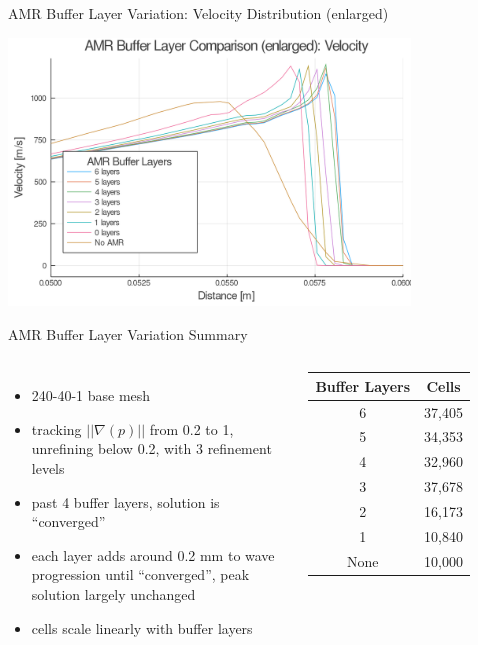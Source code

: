 \begin{frame}{AMR Buffer Layer Variation: Velocity Distribution (enlarged)}
\begin{center}
\includegraphics[width=0.8\textwidth]{../figs/amrfigs/amr_bufflayers/ue.png}
\end{center}
\end{frame}

\begin{frame}{AMR Buffer Layer Variation Summary}
\begin{columns}
\begin{itemize}
\item 240-40-1 base mesh
\item tracking $||\nabla (p)||$ from 0.2 to 1, unrefining below 0.2, with 3 refinement levels
\item past 4 buffer layers, solution is ``converged''
\item each layer adds around 0.2 mm to wave progression until ``converged'', peak solution largely unchanged
\item cells scale linearly with buffer layers
\end{itemize}
\begin{table}[h]
\centering
\begin{tabular}{cc}
Buffer Layers & Cells \\ \hline
6 & 37,405 \\ 
5 & 34,353 \\
4 & 32,960 \\
3 & 37,678 \\
2 & 16,173 \\
1 & 10,840 \\
None & 10,000 \\
\end{tabular}
\end{table}
\end{columns}
\end{frame}

